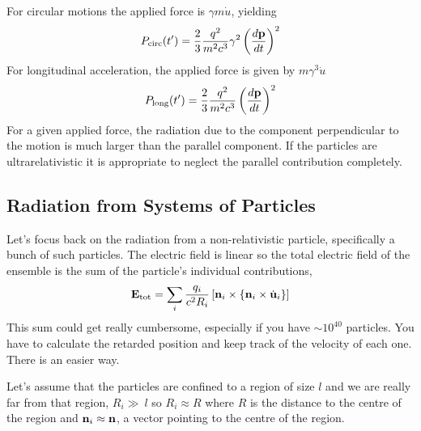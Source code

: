 For circular motions the applied force is $\gamma m {\dot u}$, yielding
\begin{equation}
P_{\hbox{\rm \scriptsize circ}}(t') = \frac{2}{3} \frac{q^2}{m^2 c^3} \gamma^2 \left ( \frac{d {\bf p}}{d t}\right )^2
\label{eq:221}
\end{equation}
For longitudinal acceleration, the applied force is given by $m \gamma^3 {\dot u}$
\begin{equation}
P_{\hbox{\rm \scriptsize long}}(t') = \frac{2}{3} \frac{q^2}{m^2 c^3} \left ( \frac{d {\bf p}}{d t}\right )^2
\label{eq:222}
\end{equation}
For a given applied force, the radiation due to the component
perpendicular to the motion is much larger than the parallel
component.  If the particles are ultrarelativistic it is appropriate
to neglect the parallel contribution completely.

\subsection{Radiation from Systems of Particles}
\label{sec:radi-from-syst}

Let's focus back on the radiation from a non-relativistic particle,
specifically a bunch of such particles.  The electric field is linear
so the total electric field of the ensemble is the sum of the
particle's individual contributions,
\begin{equation}
{\bf E}_{\hbox{\rm \scriptsize tot}} = \sum_i
 \frac{q_i}{c^2 R_i} \left [ {\bf n}_i \times
    \left \{ {\bf n}_i \times \dot{\bf u}_i \right \} \right ] 
\label{eq:223}
\end{equation}
This sum could get really cumbersome, especially if you have $\sim
10^{40}$ particles.  You have to calculate the retarded position and
keep track of the velocity of each one.   There is an easier way.

Let's assume that the particles are confined to a region of size $l$
and we are really far from that region, $R_i \gg\ l$ so $R_i \approx
R$ where $R$ is the distance to the centre of the region and ${\bf n}_i
\approx {\bf n}$, a vector pointing to the centre of the region.

